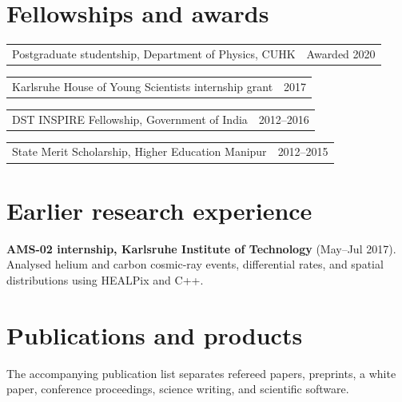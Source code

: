 \documentclass[11pt]{article}
\makeatletter
\newcommand{\dated}[2]{\par\noindent\begin{tabularx}{\linewidth}{@{}X r@{}}#1&#2\end{tabularx}\par}
\makeatother
\begin{document}
\section*{Fellowships and awards}
\dated{Postgraduate studentship, Department of Physics, CUHK}{Awarded 2020}
\dated{Karlsruhe House of Young Scientists internship grant}{2017}
\dated{DST INSPIRE Fellowship, Government of India}{2012--2016}
\dated{State Merit Scholarship, Higher Education Manipur}{2012--2015}
\section*{Earlier research experience}
\textbf{AMS-02 internship, Karlsruhe Institute of Technology} (May--Jul 2017). Analysed helium and carbon cosmic-ray events, differential rates, and spatial distributions using HEALPix and C++.
\section*{Publications and products}
The accompanying publication list separates refereed papers, preprints, a white paper, conference proceedings, science writing, and scientific software.
\end{document}
